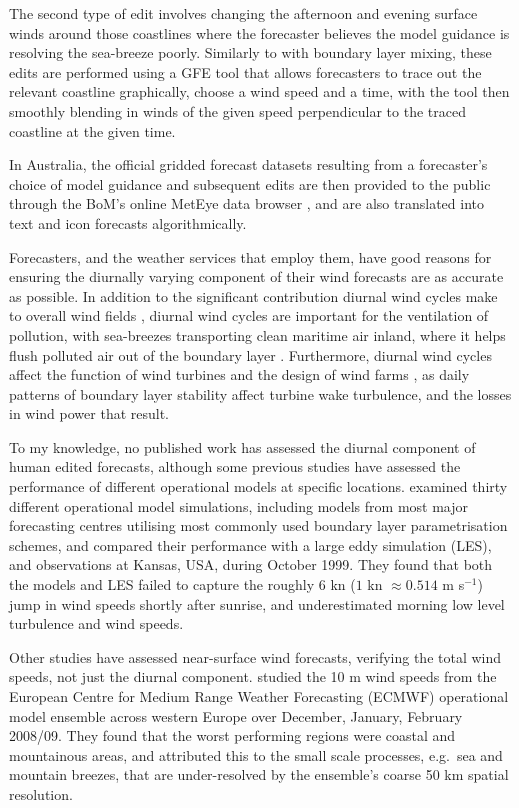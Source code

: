 \documentclass[twocol]{ametsoc}
\begin{document}
The second type of edit involves changing the afternoon and evening surface winds around those coastlines where the forecaster believes the model guidance is resolving the sea-breeze poorly. Similarly to with boundary layer mixing, these edits are performed using a GFE tool that allows forecasters to trace out the relevant coastline graphically, choose a wind speed and a time, with the tool then smoothly blending in winds of the given speed perpendicular to the traced coastline at the given time.

In Australia, the official gridded forecast datasets resulting from a forecaster's choice of model guidance and subsequent edits are then provided to the public through the BoM's online MetEye data browser \citep{bomMetEye19}, and are also translated into text and icon forecasts algorithmically. 

Forecasters, and the weather services that employ them, have good reasons for ensuring the diurnally varying component of their wind forecasts are as accurate as possible. In addition to the significant contribution diurnal wind cycles make to overall wind fields \citep[e.g.][]{dai99}, diurnal wind cycles are important for the ventilation of pollution, with sea-breezes transporting clean maritime air inland, where it helps flush polluted air out of the boundary layer \citep{miller03, physick92}. Furthermore, diurnal wind cycles affect the function of wind turbines \citep{englberger18} and the design of wind farms \citep{abkar16}, as daily patterns of boundary layer stability affect turbine wake turbulence, and the losses in wind power that result.

To my knowledge, no published work has assessed the diurnal component of human edited forecasts, although some previous studies have assessed the performance of different operational models at specific locations. \citet{svensson11} examined thirty different operational model simulations, including models from most major forecasting centres utilising most commonly used boundary layer parametrisation schemes, and compared their performance with a large eddy simulation (LES), and observations at Kansas, USA, during October 1999. They found that both the models and LES failed to capture the roughly $6$ kn ($1$ kn $\approx 0.514$ m s$^{-1}$) jump in wind speeds shortly after sunrise, and underestimated morning low level turbulence and wind speeds.

Other studies have assessed near-surface wind forecasts, verifying the total wind speeds, not just the diurnal component. \citet{pinson12} studied the 10 m wind speeds from the European Centre for Medium Range Weather Forecasting (ECMWF) operational model ensemble across western Europe over December, January, February 2008/09. They found that the worst performing regions were coastal and mountainous areas, and attributed this to the small scale processes, e.g.~sea and mountain breezes, that are under-resolved by the ensemble's coarse 50 km spatial resolution.
\end{document}
